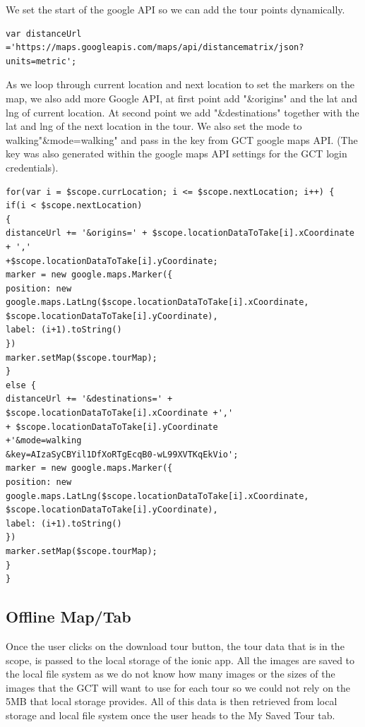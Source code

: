 		We set the start of the google API so we can add the tour points dynamically.\\
\begin{verbatim}
var distanceUrl ='https://maps.googleapis.com/maps/api/distancematrix/json?
units=metric';
\end{verbatim}

		As we loop through current location and next location to set the markers on the map, we also add more Google API, at first point add "\&origins" and the lat and lng of current location. At second point we add "\&destinations" together with the lat and lng of the next location in the tour. We also set the mode to walking"\&mode=walking" and pass in the key from GCT google maps API. (The key was also generated within the google maps API settings for the GCT login credentials).
		
\begin{verbatim}
for(var i = $scope.currLocation; i <= $scope.nextLocation; i++) {
if(i < $scope.nextLocation)
{
distanceUrl += '&origins=' + $scope.locationDataToTake[i].xCoordinate + ','
+$scope.locationDataToTake[i].yCoordinate;
marker = new google.maps.Marker({
position: new google.maps.LatLng($scope.locationDataToTake[i].xCoordinate,
$scope.locationDataToTake[i].yCoordinate),
label: (i+1).toString()
})
marker.setMap($scope.tourMap);
}
else {
distanceUrl += '&destinations=' + 
$scope.locationDataToTake[i].xCoordinate +','
+ $scope.locationDataToTake[i].yCoordinate
+'&mode=walking
&key=AIzaSyCBYil1DfXoRTgEcqB0-wL99XVTKqEkVio';
marker = new google.maps.Marker({
position: new google.maps.LatLng($scope.locationDataToTake[i].xCoordinate,
$scope.locationDataToTake[i].yCoordinate),
label: (i+1).toString()
})
marker.setMap($scope.tourMap);
}
}
\end{verbatim}
		
		\subsection{Offline Map/Tab}
		
		
		Once the user clicks on the download tour button, the tour data that is in the scope, is passed to the local storage of the ionic app. All the images are saved to the local file system as we do not know how many images or the sizes of the images that the GCT will want to use for each tour so we could not rely on the 5MB that local storage provides. All of this data is then retrieved from local storage and local file system once the user heads to the My Saved Tour tab. 
		
